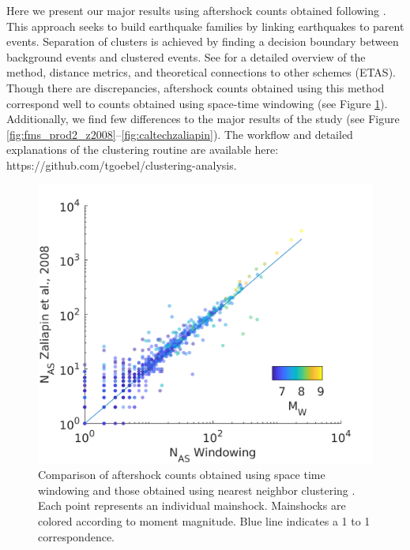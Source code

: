\documentclass[draft]{agujournal}
\begin{document}
Here we present our major results using aftershock counts obtained following \citet{Zaliapin2008}. This approach seeks to build earthquake families by linking earthquakes to parent events. Separation of clusters is achieved by finding a decision boundary between background events and clustered events. See \citet{Zaliapin2008} for a detailed overview of the method, distance metrics, and theoretical connections to other schemes (ETAS). Though there are discrepancies, aftershock counts obtained using this method correspond well to counts obtained using space-time windowing (see Figure \ref{fig:method_val}). Additionally, we find few differences to the major results of the study (see Figure \ref{fig:fms_prod2_z2008}--\ref{fig:caltechzaliapin}).
The workflow and detailed explanations of the clustering routine are available here: https://github.com/tgoebel/clustering-analysis.


\begin{figure}[H]
\centering
\includegraphics{figures/method_validation.png} 
\caption{Comparison of aftershock counts obtained using space time windowing and those obtained using nearest neighbor clustering \citep[following][]{Zaliapin2008}. Each point represents an individual mainshock. Mainshocks are colored according to moment magnitude. Blue line indicates a 1 to 1 correspondence.}
\label{fig:method_val}
\end{figure}
\end{document}
